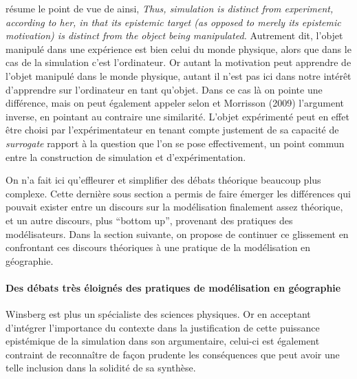 \textcite{Winsberg2013} résume le point de vue de \autocite{Peschard2010} ainsi, \textit{Thus, simulation is distinct from experiment, according to her, in that its epistemic target (as opposed to merely its epistemic motivation) is distinct from the object being manipulated.} Autrement dit, l'objet manipulé dans une expérience est bien celui du monde physique, alors que dans le cas de la simulation c'est l'ordinateur. Or autant la motivation peut apprendre de l'objet manipulé dans le monde physique, autant il n'est pas ici dans notre intérêt d'apprendre sur l'ordinateur en tant qu'objet. Dans ce cas là on pointe une différence, mais on peut également appeler selon \textcite{Winsberg2013} et Morrisson (2009) l'argument inverse, en pointant au contraire une similarité. L'objet expérimenté peut en effet être choisi par l'expérimentateur en tenant compte justement de sa capacité de \textit{surrogate} rapport à la question que l'on se pose effectivement, un point commun entre la construction de simulation et d'expérimentation. 

On n'a fait ici qu'effleurer et simplifier des débats théorique beaucoup plus complexe. Cette dernière sous section a permis de faire émerger les différences qui pouvait exister entre un discours sur la modélisation finalement assez théorique, et un autre discours, plus \foreignquote{english}{bottom up}, provenant des pratiques des modélisateurs. Dans la section suivante, on propose de continuer ce glissement en confrontant ces discours théoriques à une pratique de la modélisation en géographie.

\paragraph{Des débats très éloignés des pratiques de modélisation en géographie}

Winsberg est plus un spécialiste des sciences physiques. Or en acceptant d'intégrer l'importance du contexte dans la justification de cette puissance epistémique de la simulation dans son argumentaire, celui-ci est également contraint de reconnaître de façon prudente les conséquences que peut avoir une telle inclusion dans la solidité de sa synthèse.


